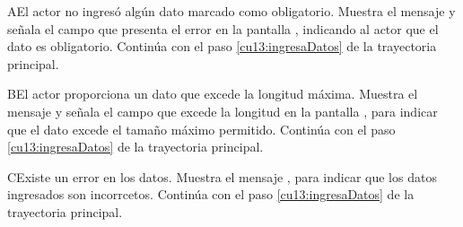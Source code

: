   
 \begin{UCtrayectoriaA}{A}{El actor no ingresó algún dato marcado como obligatorio.}
    \UCpaso[\UCsist] Muestra el mensaje  y señala el campo que presenta el error en la pantalla 
	    , indicando al actor que el dato es obligatorio.
    \UCpaso[] Continúa con el paso \ref{cu13:ingresaDatos} de la trayectoria principal.
 \end{UCtrayectoriaA}

 \begin{UCtrayectoriaA}{B}{El actor proporciona un dato que excede la longitud máxima.}
    \UCpaso[\UCsist] Muestra el mensaje  y señala el campo que excede la 
    longitud en la pantalla , para indicar que el dato excede el tamaño máximo permitido.
    \UCpaso[] Continúa con el paso \ref{cu13:ingresaDatos} de la trayectoria principal.
 \end{UCtrayectoriaA}
 \begin{UCtrayectoriaA}{C}{Existe un error en los datos.}
    \UCpaso[\UCsist] Muestra el mensaje , para indicar que los datos ingresados son incorrcetos.
    \UCpaso[] Continúa con el paso \ref{cu13:ingresaDatos} de la trayectoria principal.
 \end{UCtrayectoriaA}